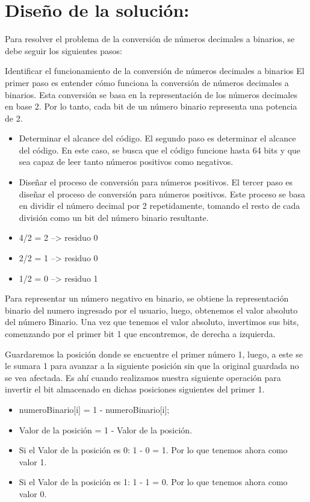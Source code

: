 \documentclass{IEEEcsmag}
\begin{document}
\section*{Diseño de la solución:}

Para resolver el problema de la conversión de números decimales a binarios, se debe seguir los siguientes pasos:

Identificar el funcionamiento de la conversión de números decimales a binarios
El primer paso es entender cómo funciona la conversión de números decimales a binarios. Esta conversión se basa en la representación de los números decimales en base 2. Por lo tanto, cada bit de un número binario representa una potencia de 2.
 \begin{itemize}
\item Determinar el alcance del código.
El segundo paso es determinar el alcance del código. En este caso, se busca que el código funcione hasta 64 bits y que sea capaz de leer tanto números positivos como negativos.

\item Diseñar el proceso de conversión para números positivos.
El tercer paso es diseñar el proceso de conversión para números positivos. Este proceso se basa en dividir el número decimal por 2 repetidamente, tomando el resto de cada división como un bit del número binario resultante.


\item 4/2 = 2 --> residuo 0
\item 2/2 = 1 --> residuo 0
\item 1/2 = 0 --> residuo 1
 \end{itemize}
 
Para representar un número negativo en binario, se obtiene la representación binario del numero ingresado por el usuario, luego, obtenemos el valor absoluto del número Binario. Una vez que tenemos el valor absoluto, invertimos sus bits, comenzando por el primer bit 1 que encontremos, de derecha a izquierda.

Guardaremos la posición donde se encuentre el primer número 1, luego, a este se le sumara 1 para avanzar a la siguiente posición sin que la original guardada no se vea afectada. Es ahí cuando realizamos nuestra siguiente operación para invertir el bit almacenado en dichas posiciones siguientes del primer 1.

\begin{itemize}
\item numeroBinario[i] = 1 - numeroBinario[i];
\item Valor de la posición = 1 - Valor de la posición.
\item Si el Valor de la posición es 0: 1 - 0 = 1. Por lo que tenemos ahora como valor 1.
\item Si el Valor de la posición es 1: 1 - 1 = 0. Por lo que tenemos ahora como valor 0. 
\end{itemize}
\end{document}
